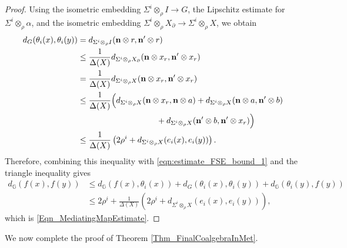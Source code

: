 \documentclass{sn-jnl}%
\theoremstyle{thmstyleone}%
\theoremstyle{thmstyletwo}%
\theoremstyle{thmstylethree}%
\newcommand{\M}{\Sigma}
\newcommand{\Fwi}[1]{\M^{#1}\otimes_{\w}}
\newcommand{\G}{\mathbb{G}}
\newcommand{\w}{\rho}
\begin{document}
\begin{proof}
Using the isometric embedding $\Fwi{i}I\rightarrow G$, the Lipschitz estimate for $\Fwi{i}\alpha$, and the isometric embedding $\Fwi{i}X_\partial\rightarrow \Fwi{i}X$, we obtain
\begin{equation} 
\nonumber
\begin{aligned}
    d_G(\theta_i(x),\theta_i(y))
        & = d_{\Fwi{i}I}(\mathbf{n}\otimes r,\mathbf{n}'\otimes r) \\
        & \leq \frac{1}{\Delta(X)} d_{\Fwi{i}X_\partial}(\mathbf{n}\otimes x_r,\mathbf{n}'\otimes x_r) \\
        & = \frac{1}{\Delta(X)}       d_{\Fwi{i}X}(\mathbf{n}\otimes x_r,\mathbf{n}'\otimes x_r) \\
        & \leq \frac{1}{\Delta(X)}\Bigl( d_{\Fwi{i}X}(\mathbf{n}\otimes x_r,\mathbf{n}\otimes a)       +d_{\Fwi{i}X}(\mathbf{n}\otimes a,\mathbf{n}'\otimes b) \\
        & \hspace{96pt} +d_{\Fwi{i}X}(\mathbf{n}'\otimes b,\mathbf{n}'\otimes x_r) \Bigr) \\
        & \leq \frac{1}{\Delta(X)} \left(2\w^i+d_{\Fwi{i}X}(e_i(x),e_i(y))\right).
\end{aligned}
\end{equation}
Therefore, combining this inequality with \eqref{eqn:estimate_FSE_bound_1} and the triangle inequality gives
\begin{equation} 
\nonumber
\begin{aligned}
    d_\G(f(x),f(y)) & \leq d_\G(f(x),\theta_i(x)) +d_G(\theta_i(x),\theta_i(y))        +d_\G(\theta_i(y),f(y)) \\
        & \leq 2\w^i+ \frac{1}{\Delta(X)} \left( 2\w^i+d_{\Fwi{i}X}(e_i(x),e_i(y)) \right),
\end{aligned}
\end{equation}
which is \eqref{Eqn_MediatingMapEstimate}.
\end{proof}

We now complete the proof of Theorem \ref{Thm_FinalCoalgebraInMet}. 
\end{document}
